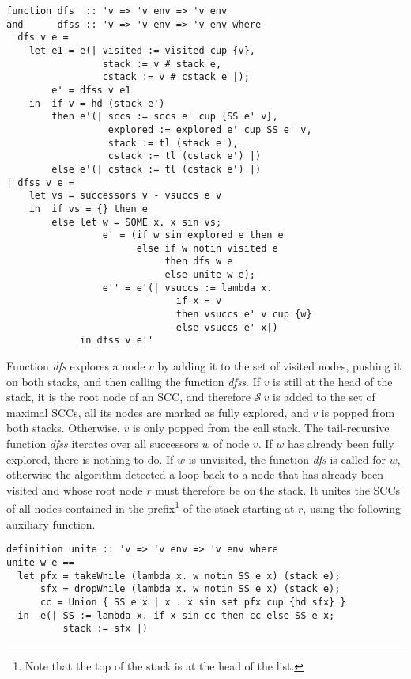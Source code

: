 \documentclass[sigplan,10pt,anonymous,review]{acmart}
\newcommand{\prog}[1]{\textit{#1}}
\renewcommand{\SS}{\mathcal{S}}
\begin{document}
\begin{small}
\begin{lstlisting}[language=isabelle]
function dfs  :: 'v => 'v env => 'v env
and      dfss :: 'v => 'v env => 'v env where
  dfs v e =
    let e1 = e(| visited := visited cup {v},
                 stack := v # stack e,
                 cstack := v # cstack e |);
        e' = dfss v e1
    in  if v = hd (stack e')
        then e'(| sccs := sccs e' cup {SS e' v},
                  explored := explored e' cup SS e' v,
                  stack := tl (stack e'),
                  cstack := tl (cstack e') |)
        else e'(| cstack := tl (cstack e') |)
| dfss v e =
    let vs = successors v - vsuccs e v
    in  if vs = {} then e
        else let w = SOME x. x sin vs;
                 e' = (if w sin explored e then e
                       else if w notin visited e
                            then dfs w e
                            else unite w e);
                 e'' = e'(| vsuccs := lambda x. 
                              if x = v 
                              then vsuccs e' v cup {w}
                              else vsuccs e' x|)
             in dfss v e''
\end{lstlisting}
\end{small}

Function \prog{dfs} explores a node $v$ by adding it to the set of visited nodes, pushing it on both stacks, and then calling the function \prog{dfss}. If $v$ is still at the head of the stack, it is the root node of an SCC, and therefore $\SS~v$ is added to the set of maximal SCCs, all its nodes are marked as fully explored, and $v$ is popped from both stacks. Otherwise, $v$ is only popped from the call stack. The tail-recursive function \prog{dfss} iterates over all successors $w$ of node $v$. If $w$ has already been fully explored, there is nothing to do. If $w$ is unvisited, the function \prog{dfs} is called for $w$, otherwise the algorithm detected a loop back to a node that has already been visited and whose root node $r$ must therefore be on the stack. It unites the SCCs of all nodes contained in the prefix\footnote{Note that the top of the stack is at the head of the list.} of the stack starting at $r$, using the following auxiliary function.

\begin{small}
\begin{lstlisting}[language=isabelle]
definition unite :: 'v => 'v env => 'v env where
unite w e ==
  let pfx = takeWhile (lambda x. w notin SS e x) (stack e);
      sfx = dropWhile (lambda x. w notin SS e x) (stack e);
      cc = Union { SS e x | x . x sin set pfx cup {hd sfx} }
  in  e(| SS := lambda x. if x sin cc then cc else SS e x;
          stack := sfx |)
\end{lstlisting}
\end{small}
\end{document}
